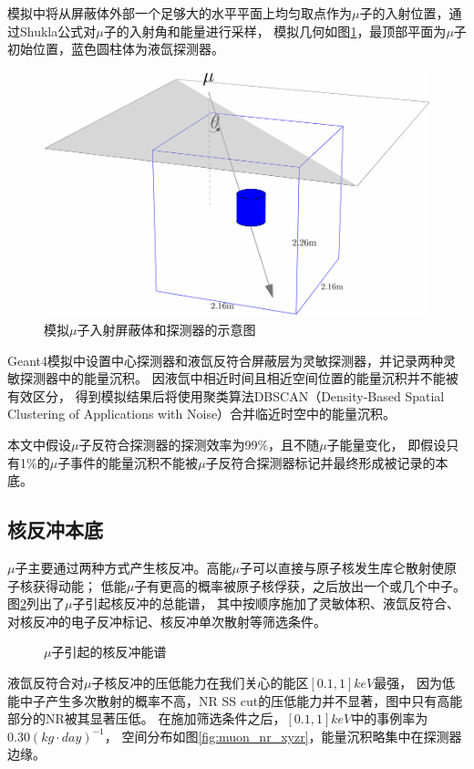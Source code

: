 模拟中将从屏蔽体外部一个足够大的水平平面上均匀取点作为$\mu$子的入射位置，通过Shukla公式对$\mu$子的入射角和能量进行采样，
模拟几何如图\ref{fig:muon_inject}，最顶部平面为$\mu$子初始位置，蓝色圆柱体为液氙探测器。

\begin{figure}
  \centering
  \includegraphics[width=0.7\linewidth]{figures/muon_inject.pdf}
  \caption{\label{fig:muon_inject} 模拟$\mu$子入射屏蔽体和探测器的示意图}
\end{figure}

Geant4模拟中设置中心探测器和液氙反符合屏蔽层为灵敏探测器，并记录两种灵敏探测器中的能量沉积。
因液氙中相近时间且相近空间位置的能量沉积并不能被有效区分，
得到模拟结果后将使用聚类算法DBSCAN（Density-Based Spatial Clustering of Applications with Noise）\cite{ester_density-based_1996,schubert_dbscan_2017}合并临近时空中的能量沉积。

本文中假设$\mu$子反符合探测器的探测效率为99\%，且不随$\mu$子能量变化，
即假设只有1\%的$\mu$子事件的能量沉积不能被$\mu$子反符合探测器标记并最终形成被记录的本底。

\subsection{核反冲本底}
\label{sec:muon_nr}

$\mu$子主要通过两种方式产生核反冲。高能$\mu$子可以直接与原子核发生库仑散射使原子核获得动能；
低能$\mu$子有更高的概率被原子核俘获，之后放出一个或几个中子。图\ref{fig:muon_nr}列出了$\mu$子引起核反冲的总能谱，
其中按顺序施加了灵敏体积、液氙反符合、对核反冲的电子反冲标记、核反冲单次散射等筛选条件。

\begin{figure}
  \centering
  
  \caption{\label{fig:muon_nr} $\mu$子引起的核反冲能谱}
\end{figure}

液氙反符合对$\mu$子核反冲的压低能力在我们关心的能区$[0.1,1]\si{keV}$最强，
因为低能中子产生多次散射的概率不高，NR SS cut的压低能力并不显著，图中只有高能部分的NR被其显著压低。
在施加筛选条件之后，$[0.1,1]\si{keV}$中的事例率为$0.30\left(\si{kg}\cdot\si{day}\right)^{-1}$，
空间分布如图\ref{fig:muon_nr_xyzr}，能量沉积略集中在探测器边缘。

